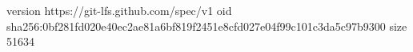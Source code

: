 version https://git-lfs.github.com/spec/v1
oid sha256:0bf281fd020e40ec2ae81a6bf819f2451e8cfd027e04f99c101c3da5c97b9300
size 51634
